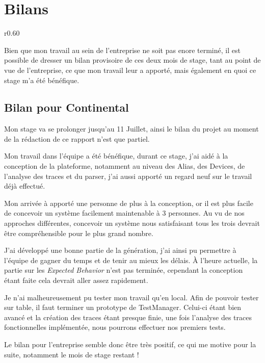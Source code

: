 \chapter{Bilans}
\begin{wrapfigure}{r}{0.60\textwidth}
\vspace{-25px}
\begin{minipage}{0.60\textwidth}
\minitoc
\end{minipage}
\end{wrapfigure}
Bien que mon travail au sein de l'entreprise ne soit pas enore terminé, il est possible de dresser un bilan provisoire de ces deux mois de stage, tant au point de vue de l'entreprise, ce que mon travail leur a apporté, mais également en quoi ce stage m'a été bénéfique.

	\section{Bilan pour Continental}
	Mon stage va se prolonger jusqu'au 11 Juillet, ainsi le bilan du projet au moment de la rédaction de ce rapport n'est que partiel. 

	Mon travail dans l'équipe a été bénéfique, durant ce stage, j'ai aidé à la conception de la plateforme, notamment au niveau des Alias, des Devices, de l'analyse des traces et du parser,	j'ai aussi apporté un regard neuf sur le travail déjà effectué.

	Mon arrivée à apporté une personne de plus à la conception, or il est plus facile de concevoir un système facilement maintenable à 3 personnes. Au vu de nos
	approches différentes, concevoir un système nous satisfaisant tous les trois devrait être compréhensible pour le plus grand nombre.
	
	J'ai développé une bonne partie de la génération, j'ai ainsi pu permettre à l'équipe de gagner du temps et de
	tenir au mieux les délais. À l'heure actuelle, la partie sur les \textit{Expected Behavior} n'est pas terminée, cependant la conception étant faite cela devrait aller
	assez rapidement.
	
	Je n'ai malheureusement pu tester mon travail qu'en local. Afin de pouvoir tester sur table, il faut terminer un prototype de TestManager. Celui-ci étant bien
	avancé et la création des traces étant presque finie, une fois l'analyse des traces fonctionnelles implémentée, nous pourrons effectuer nos premiers tests.

	Le bilan pour l'entreprise semble donc être très positif, ce qui me motive pour la suite, notamment le mois de stage restant !

